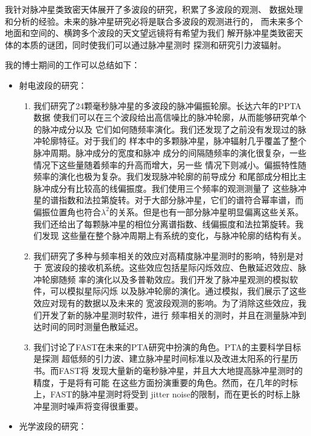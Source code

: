 

我针对脉冲星类致密天体展开了多波段的研究，积累了多波段的观测、
数据处理和分析的经验。未来的脉冲星研究必将是联合多波段的观测进行的，
而未来多个地面和空间的、横跨多个波段的天文望远镜将有希望为我们
解开脉冲星类致密天体的本质的谜团，同时使我们可以通过脉冲星测时
探测和研究引力波辐射。

我的博士期间的工作可以总结如下：
\begin{itemize}
\item 射电波段的研究：

\begin{enumerate}
\item 我们研究了24颗毫秒脉冲星的多波段的脉冲偏振轮廓。长达六年的PPTA数据
使我们可以在三个波段给出高信噪比的脉冲轮廓，从而能够研究单个的脉冲成分以及
它们如何随频率演化。我们还发现了之前没有发现过的脉冲轮廓特征。对于我们的
样本中的多颗脉冲星，脉冲辐射几乎覆盖了整个脉冲周期。脉冲成分的宽度和脉冲
成分的间隔随频率的演化很复杂，一些情况下这些量随着频率的升高而增大，另一些
情况下则减小。偏振特性随频率的演化也极为复杂。我们发现脉冲轮廓的前导成分
和尾部成分相比主脉冲成分有比较高的线偏振度。我们使用三个频率的观测测量了
这些脉冲星的谱指数和法拉第旋转。对于大部分脉冲星，它们的谱符合幂率谱，而
偏振位置角也符合$\lambda^2$的关系。但是也有一部分脉冲星明显偏离这些关系。
我们还给出了每颗脉冲星的相位分离谱指数、线偏振度和法拉第旋转。我们发现
这些量在整个脉冲周期上有系统的变化，与脉冲轮廓的结构有关。
\item 我们研究了多种与频率相关的效应对高精度脉冲星测时的影响，特别是对于
宽波段的接收机系统。这些效应包括星际闪烁效应、色散延迟效应、脉冲轮廓随频
率的演化以及多普勒效应。我们开发了脉冲星观测的模拟软件，可以模拟星际闪烁
以及脉冲轮廓的演化。通过模拟，我们展示了这些效应对现有的数据以及未来的
宽波段观测的影响。为了消除这些效应，我们开发了新的脉冲星测时软件，进行
频率相关的测时，并且在测量脉冲到达时间的同时测量色散延迟。
\item 我们讨论了FAST在未来的PTA研究中扮演的角色。PTA的主要科学目标是探测
超低频的引力波、建立脉冲星时间标准以及改进太阳系的行星历书。而FAST将
发现大量新的毫秒脉冲星，并且大大地提高脉冲星测时的精度，于是将有可能
在这些方面扮演重要的角色。然而，在几年的时标上，FAST的脉冲星测时将受到
jitter noise的限制，而在更长的时标上脉冲星测时噪声将变得很重要。

\end{enumerate}

\item 光学波段的研究：


\end{itemize}
